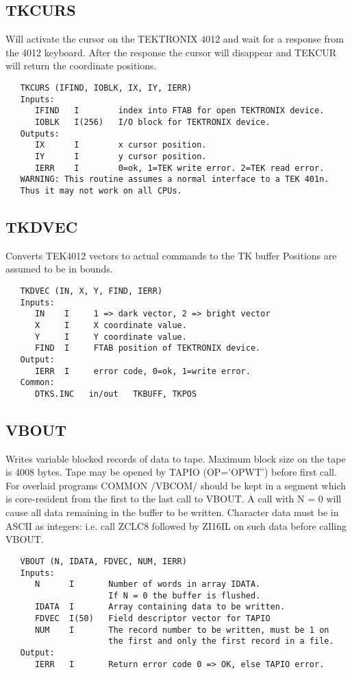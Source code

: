 \subsection{TKCURS}
Will activate the cursor on the TEKTRONIX 4012 and wait for
a response from the 4012 keyboard. After the response the cursor
will disappear and TEKCUR will return the coordinate positions.
\begin{verbatim}
   TKCURS (IFIND, IOBLK, IX, IY, IERR)
   Inputs:
      IFIND   I        index into FTAB for open TEKTRONIX device.
      IOBLK   I(256)   I/O block for TEKTRONIX device.
   Outputs:
      IX      I        x cursor position.
      IY      I        y cursor position.
      IERR    I        0=ok, 1=TEK write error. 2=TEK read error.
   WARNING: This routine assumes a normal interface to a TEK 401n.
   Thus it may not work on all CPUs.
\end{verbatim}

\subsection{TKDVEC}
Converts TEK4012 vectors to actual commands to the TK buffer
Positions are assumed to be in bounds.
\begin{verbatim}
   TKDVEC (IN, X, Y, FIND, IERR)
   Inputs:
      IN    I     1 => dark vector, 2 => bright vector
      X     I     X coordinate value.
      Y     I     Y coordinate value.
      FIND  I     FTAB position of TEKTRONIX device.
   Output:
      IERR  I     error code, 0=ok, 1=write error.
   Common:
      DTKS.INC   in/out   TKBUFF, TKPOS
\end{verbatim}

\subsection{VBOUT}
Writes variable blocked records of data to tape.  Maximum
block size on the tape is 4008 bytes.  Tape may be opened by TAPIO
(OP='OPWT') before first call.  For overlaid programs COMMON /VBCOM/
should be kept in a segment which is core-resident from the first
to the last call to VBOUT.  A call with N = 0 will cause all data
remaining in the buffer to be written.  Character data must be in
ASCII as integers: i.e. call ZCLC8 followed by ZI16IL on such data
before calling VBOUT.
\begin{verbatim}
   VBOUT (N, IDATA, FDVEC, NUM, IERR)
   Inputs:
      N      I       Number of words in array IDATA.
                     If N = 0 the buffer is flushed.
      IDATA  I       Array containing data to be written.
      FDVEC  I(50)   Field descriptor vector for TAPIO
      NUM    I       The record number to be written, must be 1 on
                     the first and only the first record in a file.
   Output:
      IERR   I       Return error code 0 => OK, else TAPIO error.

\end{verbatim}

